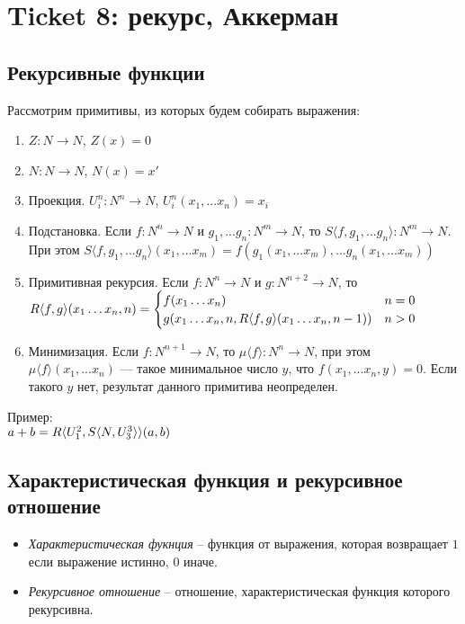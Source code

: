 \section{Ticket 8: рекурс, Аккерман}
\label{sec-10}
\subsection{Рекурсивные функции}
\label{sec-10-1}
Рассмотрим примитивы, из которых будем собирать выражения:

\begin{enumerate}
\item $Z: N \rightarrow N$, $Z(x) = 0$
\item $N: N \rightarrow N$, $N(x) = x'$
\item Проекция. $U^n_i: N^n \rightarrow N$, $U^n_i (x_1, ... x_n) = x_i$
\item Подстановка. Если $f: N^n \rightarrow N$ и $g_1, ... g_n: N^m \rightarrow N$, 
  то $S\langle{}f,g_1,...g_n\rangle: N^m \rightarrow N$.
При этом $S\langle{}f,g_1,...g_n\rangle (x_1,...x_m) = f(g_1(x_1,...x_m), ... g_n(x_1,...x_m))$
\item Примитивная рекурсия. Если $f: N^n \rightarrow N$ и $g: N^{n+2} \rightarrow N$, то
	$R\langle f, g\rangle(x_1\ldots{}x_n, n) = \begin{cases}
    	f(x_1\ldots{}x_n) & n = 0 \\
    	g(x_1\ldots{}x_n, n, R\langle f, g\rangle(x_1\ldots{}x_n, n - 1)) & n > 0
	\end{cases}$\\
\item Минимизация. Если $f: N^{n+1} \rightarrow N$, то $\mu \langle{}f\rangle: N^n \rightarrow N$, при этом
  $\mu \langle{}f\rangle (x_1,...x_n)$ --- такое минимальное число $y$, что $f(x_1,...x_n,y) = 0$.
  Если такого $y$ нет, результат данного примитива неопределен.
\end{enumerate}

Пример:\\
$a + b = R\langle U^2_1, S\langle N, U^3_3\rangle\rangle(a, b)$
\subsection{Характеристическая функция и рекурсивное отношение}
\label{sec-10-2}
\begin{itemize}
\item \emph{Характеристическая фукнция} -- функция от выражения, которая возвращает $1$ если выражение истинно, $0$ иначе.
\item \emph{Рекурсивное отношение} -- отношение, характеристическая функция
которого рекурсивна.
\end{itemize}
